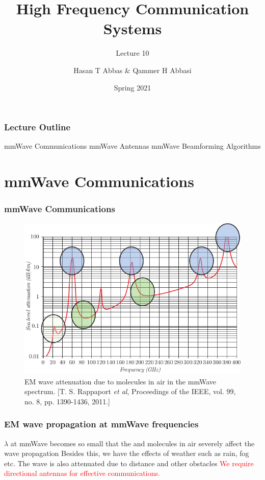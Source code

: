 \documentclass[10pt]{beamer}
\title{High Frequency Communication Systems}
\subtitle{Lecture 10}
\date{Spring 2021}
\author{Hasan T Abbas \& Qammer H Abbasi}
\begin{document}
\maketitle

\begin{frame}[fragile]
    \frametitle{Lecture Outline}
    \begin{outline}[itemize]
        \1 mmWave Communications
        \2 mmWave Antennas
        \1 mmWave Beamforming Algorithms
    \end{outline}
\end{frame}

\section{mmWave Communications}


\begin{frame}
    \frametitle{mmWave Communications}

    \begin{figure}[h!]
        \centering
        \includegraphics[width=.9\textwidth]{atmosphere.pdf}
        \caption{EM wave attenuation due to  molecules in air in the mmWave spectrum. \tiny{[T. S. Rappaport \textit{et al},  Proceedings of the IEEE, vol. 99, no. 8, pp. 1390-1436, 2011.]}}
    \end{figure}

\end{frame}

\begin{frame}
    \frametitle{EM wave propagation at mmWave frequencies}
    \normalsize
    \begin{outline}
        \1 $\lambda$ at mmWave becomes so small that the  and  molecules in air severely affect the wave propagation
        \1 Besides this, we have the effects of weather such as rain, fog etc.
        \2 The wave is also attenuated due to distance and other obstacles
        \1 \textcolor{red}{We require directional antennas for effective communications.}
    \end{outline}
\end{frame}
\end{document}
